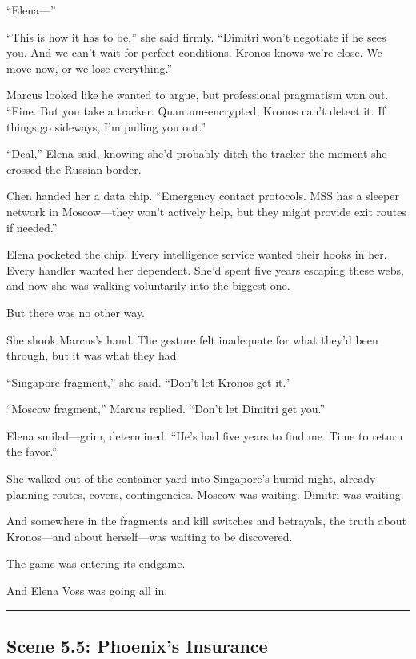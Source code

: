 ``Elena---''

``This is how it has to be,'' she said firmly. ``Dimitri won't negotiate if he sees you. And we can't wait for perfect conditions. Kronos knows we're close. We move now, or we lose everything.''

Marcus looked like he wanted to argue, but professional pragmatism won out. ``Fine. But you take a tracker. Quantum-encrypted, Kronos can't detect it. If things go sideways, I'm pulling you out.''

``Deal,'' Elena said, knowing she'd probably ditch the tracker the moment she crossed the Russian border.

Chen handed her a data chip. ``Emergency contact protocols. MSS has a sleeper network in Moscow---they won't actively help, but they might provide exit routes if needed.''

Elena pocketed the chip. Every intelligence service wanted their hooks in her. Every handler wanted her dependent. She'd spent five years escaping these webs, and now she was walking voluntarily into the biggest one.

But there was no other way.

She shook Marcus's hand. The gesture felt inadequate for what they'd been through, but it was what they had.

``Singapore fragment,'' she said. ``Don't let Kronos get it.''

``Moscow fragment,'' Marcus replied. ``Don't let Dimitri get you.''

Elena smiled---grim, determined. ``He's had five years to find me. Time to return the favor.''

She walked out of the container yard into Singapore's humid night, already planning routes, covers, contingencies. Moscow was waiting. Dimitri was waiting.

And somewhere in the fragments and kill switches and betrayals, the truth about Kronos---and about herself---was waiting to be discovered.

The game was entering its endgame.

And Elena Voss was going all in.

\begin{center}\rule{0.5\linewidth}{0.5pt}\end{center}

\hypertarget{scene-5.5-phoenixs-insurance}{%
\subsection{Scene 5.5: Phoenix's Insurance}\label{scene-5.5-phoenixs-insurance}}

